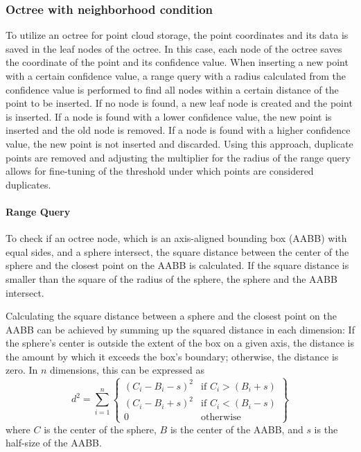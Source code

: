 \subsubsection{Octree with neighborhood condition}
To utilize an octree for point cloud storage, the point coordinates and its data is saved in the leaf nodes of the octree.
In this case, each node of the octree saves the coordinate of the point and its confidence value.
When inserting a new point with a certain confidence value, a range query with a radius calculated from the confidence value
is performed to find all nodes within a certain distance of the point to be inserted.
If no node is found, a new leaf node is created and the point is inserted.
If a node is found with a lower confidence value, the new point is inserted and the old node is removed.
If a node is found with a higher confidence value, the new point is not inserted and discarded.
Using this approach, duplicate points are removed and adjusting the multiplier for the radius of the range query
allows for fine-tuning of the threshold under which points are considered duplicates.

\paragraph{Range Query}
To check if an octree node, which is an axis-aligned bounding box (AABB) with equal sides, and a sphere intersect,
the square distance between the center of the sphere and the closest point on the AABB is calculated.
If the square distance is smaller than the square of the radius of the sphere, the sphere and the AABB intersect.

Calculating the square distance between a sphere and the closest point on the AABB can be achieved by summing up the
squared distance in each dimension:
If the sphere's center is outside the extent of the box on a given axis,
the distance is the amount by which it exceeds the box's boundary; otherwise, the distance is zero.
In $n$ dimensions, this can be expressed as
\begin{equation}
    d^2 = \sum_{i=1}^{n} \left\{
    \begin{array}{ll}
    (C_i - B_i - s)
        ^2                & \text{if } C_i > (B_i + s) \\
        (C_i - B_i + s)^2 & \text{if } C_i < (B_i - s) \\
        0                 & \text{otherwise}
    \end{array}
    \right\}
\end{equation}
where $C$ is the center of the sphere, $B$ is the center of the AABB, and $s$ is the half-size of the AABB\@.
\parencite{glassner_graphics_1994}

